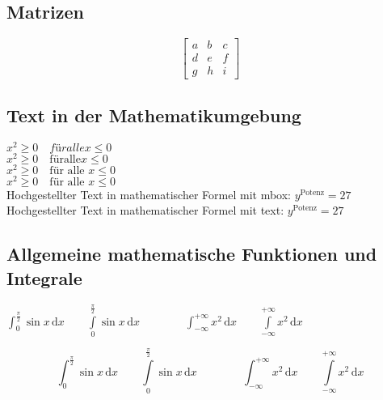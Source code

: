 \documentclass[10pt]{article}
\numberwithin{equation}{section}
\numberwithin{figure}{section}
\begin{document}
\subsection{Matrizen}

\begin{equation}
\begin{bmatrix}
  a & b & c \\
  d & e & f \\
  g & h & i
 \end{bmatrix}
\end{equation}

\subsection{Text in der Mathematikumgebung}
\setcounter{page}{1100}
\( x^2 \geq 0\quad für alle x \leq 0 \)\\ %
\( x^2 \geq 0\quad \mathrm{für alle } x \leq 0 \)\\ %
\( x^2 \geq 0\quad \mbox{für alle } x \leq 0 \)\\ %
\( x^2 \geq 0\quad \text{für alle } x \leq 0 \)\\ %
Hochgestellter Text in mathematischer Formel mit mbox: \quad \( y^{\mbox{Potenz}}=27\)\\
Hochgestellter Text in mathematischer Formel mit text: \quad \( y^{\text{Potenz}}=27\)

\subsection{Allgemeine mathematische Funktionen und Integrale}

\( \int_{0}^{\frac{\pi}{2}} \sin x\,\mathrm{d}x \qquad
\int\limits_{0}^{\frac{\pi}{2}} \sin x\,\mathrm{d}x \qquad\qquad
\int_{-\infty}^{+\infty}x^2\,\mathrm{d}x \qquad
\int\limits_{-\infty}^{+\infty}x^2\,\mathrm{d}x\)

\[ \int_{0}^{\frac{\pi}{2}} \sin x\,\mathrm{d}x \qquad
\int\limits_{0}^{\frac{\pi}{2}} \sin x\,\mathrm{d}x \qquad\qquad
\int_{-\infty}^{+\infty}x^2\,\mathrm{d}x \qquad
\int\limits_{-\infty}^{+\infty}x^2\,\mathrm{d}x\]


\end{document}
